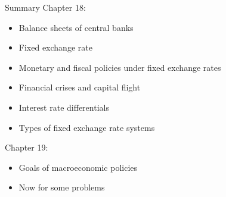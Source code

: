 \documentclass{beamer}
\begin{document}

\begin{frame}{Summary}
Chapter 18:
\begin{itemize}
\item Balance sheets of central banks
\item Fixed exchange rate
\item Monetary and fiscal policies under fixed exchange rates
\item Financial crises and capital flight
\item Interest rate differentials
\item Types of fixed exchange rate systems
\end{itemize}
Chapter 19:
\begin{itemize}
\item Goals of macroeconomic policies
\end{itemize}
\end{frame}

\begin{frame}
    \begin{itemize}
        \item Now for some problems
    \end{itemize}
\end{frame}
\end{document}
